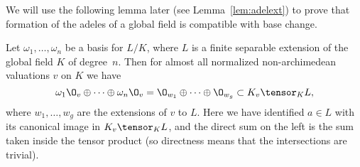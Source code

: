 We will use the following lemma later (see Lemma~\ref{lem:adelext}) to
prove that formation of the adeles of a global field 
is compatible with base change. 
\begin{lemma} \label{lem:ints_adeles}
Let $\omega_1,\ldots, \omega_n$ be a basis for $L/K$,
where $L$ is a finite separable extension of the global field
$K$ of degree~$n$. 
Then for almost all normalized non-archimedean valuations $v$ on $K$ we
have
\begin{equation}\label{eqn:sum_int}
   \omega_1 \O_{v} \oplus \cdots \oplus \omega_n \O_{v}
      = \O_{w_1} \oplus \cdots \oplus \O_{w_g}
      \subset K_v\tensor_K L,
\end{equation}
where $w_1,\ldots, w_g$ are the extensions of $v$
to $L$.   Here we have identified $a\in L$ with
its canonical image in $K_v\tensor_K L$, and the direct 
sum on the left is the sum taken inside the tensor
product (so directness means that the intersections are
trivial). 
\end{lemma}
